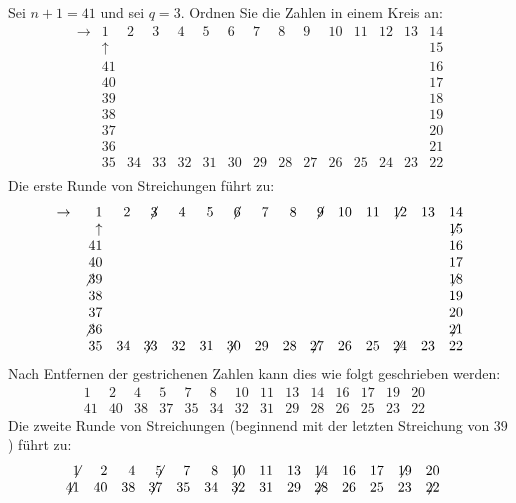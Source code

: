 \begin{example}
Sei $n+1=41$ und sei $q=3$. Ordnen Sie die Zahlen in einem Kreis an:
\[
\begin{array}{rrrrrrrrrrrrrrrrrrrrrrr}
\rightarrow&1&2&3&4&5&6&7&8&9&10&11&12&13&14\\
&\uparrow&&&&&&&&&&&&&15\\
&41&&&&&&&&&&&&&16\\
&40&&&&&&&&&&&&&17\\
&39&&&&&&&&&&&&&18\\
&38&&&&&&&&&&&&&19\\
&37&&&&&&&&&&&&&20\\
&36&&&&&&&&&&&&&21\\
&35&34&33&32&31&30&29&28&27&26&25&24&23&22\\
\end{array}
\]
Die erste Runde von Streichungen führt zu:
\[
\begin{array}{rrrrrrrrrrrrrrrrrrrrrrr}
\rightarrow&1&2&\not\! 3&4&5&\not\! 6&7&8&\not\! 9&10&11&\not\!\! 12&13&14\\
&\uparrow&&&&&&&&&&&&&\not\!\! 15\\
&41&&&&&&&&&&&&&16\\
&40&&&&&&&&&&&&&17\\
&\not 39&&&&&&&&&&&&&\not\!\! 18\\
&38&&&&&&&&&&&&&19\\
&37&&&&&&&&&&&&&20\\
&\not 36&&&&&&&&&&&&&\not\!\! 21\\
&35&34&\not\!\! 33&32&31&\not\!\! 30&29&28&\not\!\! 27&26&25&\not\!\! 24&23&22\\
\end{array}
\]
Nach Entfernen der gestrichenen Zahlen kann dies wie folgt geschrieben werden:
\[
\begin{array}{rrrrrrrrrrrrrrrrrrrrrrrrrrrr}
1&2&4&5&7&8&10&11&13&14&16&17&19&20&\\
41&40&38&37&35&34&32&31&29&28&26&25&23&22&
\end{array}
\]
Die zweite Runde von Streichungen (beginnend mit der letzten Streichung von $39$) führt zu:
\[
\begin{array}{rrrrrrrrrrrrrrrrrrrrrrrrrrrr}
\not\!\! 1&2&4&\not\!\! 5&7&8&\not\!\! 10&11&13&\not\!\! 14&16&17&\not\!\! 19&20&\\
\not\!\!41&40&38&\not\!\!37&35&34&\not\!\!32&31&29&\not\!\!28&26&25&23&\not\!\!22&


\end{array}\]
\end{example}

